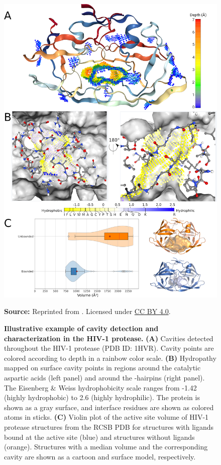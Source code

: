 \documentclass[Ingles]{phdthesis}
\begin{document}
\begin{figure}[hp]
  \centering
  \includegraphics[scale=1.8]{images/kvweb-case-study.png}
  \centerline{\tiny{\textbf{Source:} Reprinted from \cite{guerra2023A}. Licensed under \href{https://creativecommons.org/licenses/by/4.0/}{CC BY 4.0}.}}
  \caption[Illustrative example of cavity detection and characterization in the HIV-1 protease]{\textbf{Illustrative example of cavity detection and characterization in the HIV-1 protease.}  \textbf{(A)} Cavities detected throughout the HIV-1 protease (PDB ID: 1HVR). Cavity points are colored according to depth in a rainbow color scale. \textbf{(B)} Hydropathy mapped on surface cavity points in regions around the catalytic aspartic acids (left panel) and around the \textbeta-hairpins (right panel). The Eisenberg & Weiss hydrophobicity scale ranges from -1.42 (highly hydrophobic) to 2.6 (highly hydrophilic). The protein is shown as a gray surface, and interface residues are shown as colored atoms in sticks. \textbf{(C)} Violin plot of the active site volume of HIV-1 protease structures from the RCSB PDB for structures with ligands bound at the active site (blue) and structures without ligands (orange). Structures with a median volume and the corresponding cavity are shown as a cartoon and surface model, respectively.}
  \label{fig:kvweb-case-study}
\end{figure}
\end{document}
